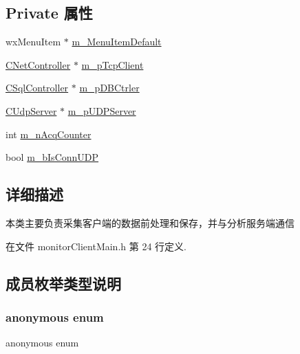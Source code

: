 \subsection*{Private 属性}
\begin{DoxyCompactItemize}
\item 
wx\+Menu\+Item $\ast$ \hyperlink{classmonitor_client_frame_afce4d0e6dc1121b650a15ef810ea569f}{m\+\_\+\+Menu\+Item\+Default}
\item 
\hyperlink{class_c_net_controller}{C\+Net\+Controller} $\ast$ \hyperlink{classmonitor_client_frame_a67dbea121b75a1235f016f0019e0c174}{m\+\_\+p\+Tcp\+Client}
\item 
\hyperlink{class_c_sql_controller}{C\+Sql\+Controller} $\ast$ \hyperlink{classmonitor_client_frame_abee9f88b2c57eb945d0f9e65e0efbd43}{m\+\_\+p\+D\+B\+Ctrler}
\item 
\hyperlink{class_c_udp_server}{C\+Udp\+Server} $\ast$ \hyperlink{classmonitor_client_frame_ab309fd5f3ceaece3a9991aa37c2d72f9}{m\+\_\+p\+U\+D\+P\+Server}
\item 
int \hyperlink{classmonitor_client_frame_adb2ac15cd3081e92a5b2aae52b809d5d}{m\+\_\+n\+Acq\+Counter}
\item 
bool \hyperlink{classmonitor_client_frame_a287627229fcd6d4cbb96b4ad0e6d1497}{m\+\_\+b\+Is\+Conn\+U\+DP}
\end{DoxyCompactItemize}


\subsection{详细描述}
本类主要负责采集客户端的数据前处理和保存，并与分析服务端通信 

在文件 monitor\+Client\+Main.\+h 第 24 行定义.



\subsection{成员枚举类型说明}
\mbox{\label{classmonitor_client_frame_a06fc87d81c62e9abb8790b6e5713c55b}} 
\subsubsection{\texorpdfstring{anonymous enum}{anonymous enum}}
{\footnotesize\ttfamily anonymous enum\hspace{0.3cm}{\ttfamily [private]}}

